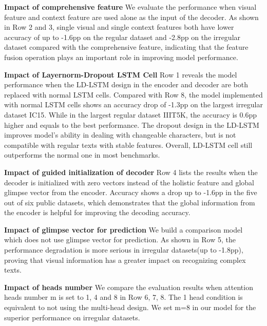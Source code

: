 \documentclass[runningheads]{llncs}
\begin{document}
\noindent\textbf{Impact of comprehensive feature} \quad 
We evaluate the performance when visual feature and context feature are used alone as the input of the decoder. As shown in Row 2 and 3, single visual and single context features both have lower accuracy of up to -1.6pp on the regular dataset and -2.8pp on the irregular dataset compared with the comprehensive feature, indicating that the feature fusion operation plays an important role in improving model performance.   

\noindent \textbf{Impact of Layernorm-Dropout LSTM Cell} \quad
Row 1 reveals the model performance when the LD-LSTM design in the encoder and decoder are both replaced with normal LSTM cells. Compared with Row 8, the model implemented with normal LSTM cells shows an accuracy drop of -1.3pp on the largest irregular dataset IC15. While in the largest regular dataset IIIT5K, the accuracy is 0.6pp higher and equals to the best performance\cite{yue2020robustscanner}. The dropout design in the LD-LSTM improves model's ability in dealing with changeable characters, but is not compatible with regular texts with stable features. Overall, LD-LSTM cell still outperforms the normal one in most benchmarks. 

\noindent \textbf{Impact of guided initialization of decoder} \quad
Row 4 lists the results when the decoder is initialized with zero vectors instead of the holistic feature and global glimpse vector from the encoder. Accuracy shows a drop up to -1.6pp in the five out of six public datasets, which demonstrates that the global information from the encoder is helpful for improving the decoding accuracy. 

\noindent \textbf{Impact of glimpse vector for prediction} \quad
We build a comparison model which does not use glimpse vector for prediction. As shown in Row 5, the performance degradation is more serious in irregular datasets(up to -1.8pp), proving that visual information has a greater impact on recognizing complex texts.

\noindent\textbf{Impact of heads number} \quad
We compare the evaluation results when attention heads number m is set to 1, 4 and 8 in Row 6, 7, 8. The 1 head condition is equivalent to not using the multi-head design. We set m=8 in our model for the superior performance on irregular datasets.
\end{document}
